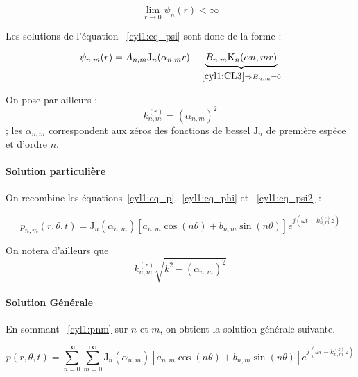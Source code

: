 \documentclass[11pt]{article}
\newcommand{\J}{\mathrm{J}}
\begin{document}
\begin{equation}
    \lim_{r\to 0} \psi_n(r) < \infty \label{cyl1:CL3}
\end{equation}

Les solutions de l'équation ~\eqref{cyl1:eq_psi} sont donc de la forme :

\begin{equation}
    \psi_{n,m}(r) = A_{n,m}\J_n(\alpha_{n,m}r) + \underbrace{B_{n,m}\mathrm{K}_n(\alpha{n,m}r)}_{\eqref{cyl1:CL3}
        \Rightarrow B_{n,m}
    = 0} \label{cyl1:eq_psi2}
\end{equation}

On pose par ailleurs : $$k_{n,m}^{(r)} = (\alpha_{n,m})^2$$ ; les $\alpha_{n,m}$ correspondent aux zéros des fonctions
de bessel $\J_n$ de première espèce et d'ordre $n$.

\paragraph{Solution particulière}

On recombine les équations~\eqref{cyl1:eq_p},~\eqref{cyl1:eq_phi} et ~\eqref{cyl1:eq_psi2} :

\begin{equation}
    p_{n,m}(r,\theta,t) = \J_n(\alpha_{n,m})\left[a_{n,m}\cos(n\theta)+b_{n,m}\sin(n\theta)\right]e^{j(\omega t - k_{n,m}^{(z)}z)} \label{cyl1:pnm}
\end{equation}

On notera d'ailleurs que $$k_{n,m}^{(z)}\sqrt{k^2-(\alpha_{n,m})^2}$$

\paragraph{Solution Générale} En sommant ~\eqref{cyl1:pnm} sur $n$ et $m$, on obtient la solution générale suivante.

\begin{equation}
    p(r,\theta,t) = \sum_{n=0}^\infty\sum_{m=0}^\infty
    \J_n(\alpha_{n,m})\left[a_{n,m}\cos(n\theta)+b_{n,m}\sin(n\theta)\right]e^{j(\omega t - k_{n,m}^{(z)}z)}
    \label{cyl1:ptot}
\end{equation}
\end{document}
